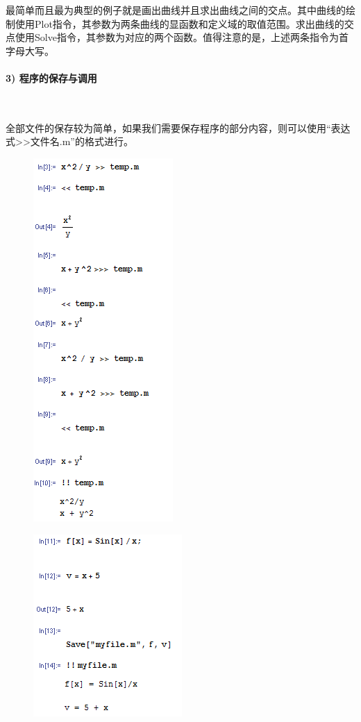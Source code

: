 \documentclass[UTF8]{ctexart}
\begin{document}
  最简单而且最为典型的例子就是画出曲线并且求出曲线之间的交点。其中曲线的绘制使用Plot指令，其参数为两条曲线的显函数和定义域的取值范围。求出曲线的交点使用Solve指令，其参数为对应的两个函数。值得注意的是，上述两条指令为首字母大写。
  
  \paragraph{3) 程序的保存与调用}

  ~

  全部文件的保存较为简单，如果我们需要保存程序的部分内容，则可以使用“表达式>>文件名.m”的格式进行。

  \begin{figure}[!htb]
  \centering
  \includegraphics[]{2.png}
  \end{figure}

  \begin{figure}[!htb]
  \centering
  \includegraphics[]{3.png}
  \end{figure}
\end{document}
